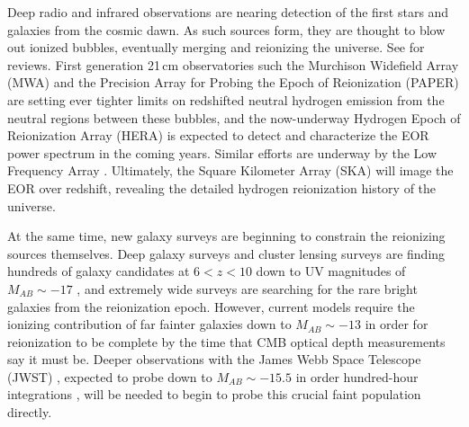 \documentclass{emulateapj}
\begin{document}
Deep radio and infrared observations are nearing detection of the first stars and galaxies from the cosmic dawn. As such sources form, they are thought to blow out ionized bubbles, eventually merging and reionizing the universe. See \citet{FurlanettoReview,miguelreview,PritchardLoebReview,Mesinger16} for reviews. First generation 21\,cm observatories such the Murchison Widefield Array (MWA) \citep{tingay13,mwascience} and the Precision Array for Probing the Epoch of Reionization (PAPER) \citep{parsons14,ali15,PoberPAPER64Heating,DannyMultiRedshift} are setting ever tighter limits on redshifted neutral hydrogen emission from the neutral regions between these bubbles, and the now-underway Hydrogen Epoch of Reionization Array (HERA) \citep{deboer16,neben16b,ewallwice16,patra16} is expected to detect and characterize the EOR power spectrum in the coming years. Similar efforts are underway by the Low Frequency Array \citep{lofareorpaper,lofar}. Ultimately, the Square Kilometer Array (SKA)  \citep{ska,ska1,ska2,ska3} will image the EOR over redshift, revealing the detailed hydrogen reionization history of the universe. 

At the same time, new galaxy surveys are beginning to constrain the reionizing sources themselves. Deep galaxy surveys \citep{Bowler2017,Roberts-Borsani2016,Bowler2015,Wilkins12015,Bouwens2015,Bouwens2013,Dunlop2013,Illingworth2013,Ellis2013,Robertson2013,Oesch2013,Grogin2011,Bouwens2011} and cluster lensing surveys \citep{Livermore2016,Ebeling2016,McLeod2016,Bouwens2016,Bouwens2016a,Coe2015,Huang2015,McLeod2015,Atek2015} are finding hundreds of galaxy candidates at $6<z<10$ down to UV magnitudes of $M_{AB}\sim-17$ \citep{Finkelstein2015}, and extremely wide surveys are searching for the rare bright galaxies \citep{Bernard2016,Calvi,Schmidt2014,Bradley2012,Trenti2011} from the reionization epoch. However, current models require the ionizing contribution of far fainter galaxies down to $M_{AB}\sim-13$ \citep{Bouwens2016b,Alvarez2012} in order for reionization to be complete by the time that CMB optical depth measurements \citep{planck16} say it must be. Deeper observations with the James Webb Space Telescope (JWST) \citep{Gardner2006}, expected to probe down to $M_{AB}\sim-15.5$ in order hundred-hour integrations \citep{Finkelstein2015}, will be needed to begin to probe this crucial faint population directly.
\end{document}
